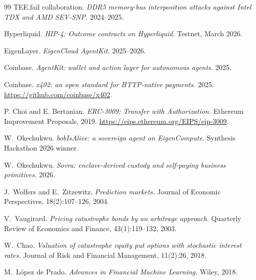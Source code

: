 \documentclass[11pt,letterpaper]{article}
\begin{document}
\begin{thebibliography}{99}
 TEE.fail collaboration. \emph{DDR5 memory-bus interposition attacks against Intel TDX and AMD SEV-SNP.} 2024--2025.

 Hyperliquid. \emph{HIP-4: Outcome contracts on Hyperliquid.} Testnet, March 2026.

 EigenLayer. \emph{EigenCloud AgentKit.} 2025--2026.

 Coinbase. \emph{AgentKit: wallet and action layer for autonomous agents.} 2025.

 Coinbase. \emph{x402: an open standard for HTTP-native payments.} 2025. \url{https://github.com/coinbase/x402}.

 P. Choi and E. Bertanian. \emph{ERC-3009: Transfer with Authorization.} Ethereum Improvement Proposals, 2019. \url{https://eips.ethereum.org/EIPS/eip-3009}.

 W.~Okechukwu. \emph{bobIsAlive: a sovereign agent on EigenCompute.} Synthesis Hackathon 2026 winner.

 W.~Okechukwu. \emph{Sovra: enclave-derived custody and self-paying business primitives.} 2026.

 J.~Wolfers and E.~Zitzewitz. \emph{Prediction markets.} Journal of Economic Perspectives, 18(2):107--126, 2004.

 V.~Vaugirard. \emph{Pricing catastrophe bonds by an arbitrage approach.} Quarterly Review of Economics and Finance, 43(1):119--132, 2003.

 W.~Chao. \emph{Valuation of catastrophe equity put options with stochastic interest rates.} Journal of Risk and Financial Management, 11(2):26, 2018.

 M.~L\'opez de Prado. \emph{Advances in Financial Machine Learning.} Wiley, 2018.

\end{thebibliography}
\end{document}
